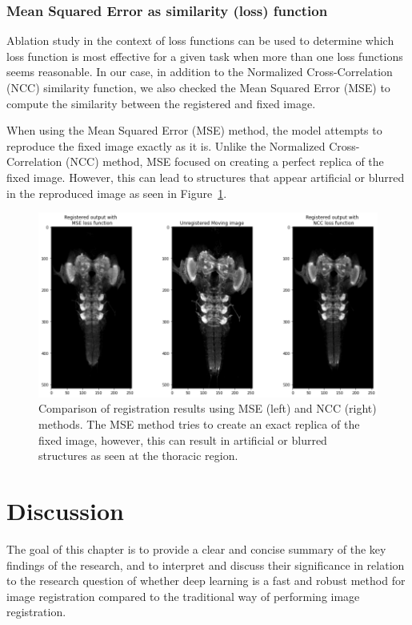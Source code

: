 \documentclass{book}
\begin{document}
	\subsection{Mean Squared Error as similarity (loss) function}
	Ablation study in the context of loss functions can be used to determine which loss function is most effective for a given task when more than one loss functions seems reasonable. In our case, in addition to the Normalized Cross-Correlation (NCC) similarity function, we also checked the Mean Squared Error (MSE) to compute the similarity between the registered and fixed image.
	
	When using the Mean Squared Error (MSE) method, the model attempts to reproduce the fixed image exactly as it is. Unlike the Normalized Cross-Correlation (NCC) method, MSE focused on creating a perfect replica of the fixed image. However, this can lead to structures that appear artificial or blurred in the reproduced image as seen in Figure~\ref{fig:ablation_loss}.
	
	\begin{figure}[h!]
		\centering
		\includegraphics[width=0.9\columnwidth]{resources/ablation_loss/ablation_loss.png}
		\caption{Comparison of registration results using MSE (left) and NCC (right) methods. The MSE method tries to create an exact replica of the fixed image, however, this can result in artificial or blurred structures as seen at the thoracic region.}
		\label{fig:ablation_loss}
	\end{figure}
		
	\chapter{Discussion}\label{chapter:discussion}
	The goal of this chapter is to provide a clear and concise summary of the key findings of the research, and to interpret and discuss their significance in relation to the research question of whether deep learning is a fast and robust method for image registration compared to the traditional way of performing image registration.
	
\end{document}
